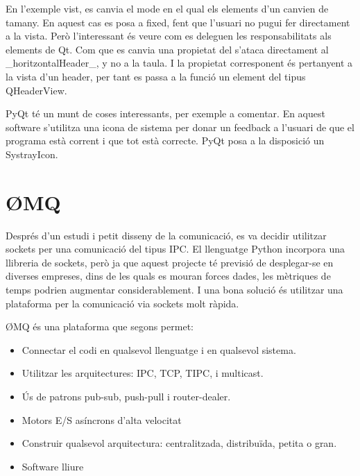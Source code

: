 \documentclass[letterpaper,11pt,catalan]{sphinxmanual}
\begin{document}
\begin{sphinxVerbatim}[commandchars=\\\{\}]
\end{sphinxVerbatim}

En l'exemple vist, es canvia el mode en el qual els elements d'un  canvien de tamany. En aquest cas es posa a fixed, fent que l'usuari no pugui fer  directament a la vista. Però l'interessant és veure com es deleguen les responsabilitats als elements de Qt. Com que es canvia una propietat del  s'ataca directament al \_horitzontalHeader\_, y no a la taula. I la propietat corresponent
és pertanyent a la vista d'un header, per tant es passa a la funció un element del tipus QHeaderView.

PyQt té un munt de coses interessants, per exemple a comentar. En aquest software s'utilitza una icona
de sistema per donar un feedback a l'usuari de que el programa està corrent i que tot està correcte. PyQt
posa a la disposició un SystrayIcon.


\section{ØMQ}
\label{\detokenize{index:omq}}
Després d'un estudi i petit disseny de la comunicació, es va decidir utilitzar sockets per
una comunicació del tipus IPC.
El llenguatge Python incorpora una llibreria de sockets, però ja que aquest projecte té previsió
de desplegar-se en diverses empreses, dins de les quals es mouran forces dades, les mètriques
de temps podrien augmentar considerablement. I una bona solució és utilitzar una plataforma
per la comunicació via sockets molt ràpida.

ØMQ és una plataforma que segons  permet:
\begin{itemize}
\item {} 
Connectar el codi en qualsevol llenguatge i en qualsevol sistema.

\item {} 
Utilitzar les arquitectures: IPC, TCP, TIPC, i multicast.

\item {} 
Ús de patrons pub-sub, push-pull i router-dealer.

\item {} 
Motors E/S asíncrons d'alta velocitat

\item {} 
Construir qualsevol arquitectura: centralitzada, distribuïda, petita o gran.

\item {} 
Software lliure

\end{itemize}
\end{document}
